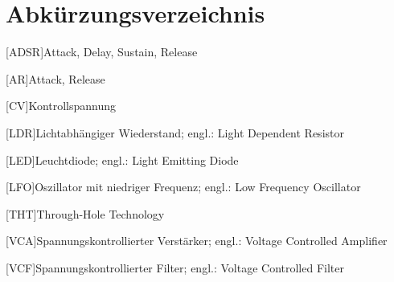 
\chapter{Abkürzungsverzeichnis}

\begin{acronym}
[ADSR]{Attack, Delay, Sustain, Release}
\end{acronym}

\begin{acronym}
[AR]{Attack, Release}
\end{acronym}

\begin{acronym}
[CV]{Kontrollspannung}
\end{acronym}

\begin{acronym}
[LDR]{Lichtabhängiger Wiederstand; engl.: Light Dependent Resistor}
\end{acronym}

\begin{acronym}
[LED]{Leuchtdiode; engl.: Light Emitting Diode}
\end{acronym}

\begin{acronym}
[LFO]{Oszillator mit niedriger Frequenz; engl.: Low Frequency Oscillator}
\end{acronym}

\begin{acronym}
[THT]{Through-Hole Technology}
\end{acronym}

\begin{acronym}
[VCA]{Spannungskontrollierter Verstärker; engl.: Voltage Controlled Amplifier}
\end{acronym}

\begin{acronym}
[VCF]{Spannungskontrollierter Filter; engl.: Voltage Controlled Filter}
\end{acronym}
